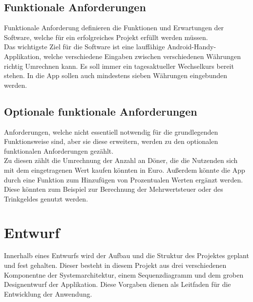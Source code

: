 \documentclass[conference]{IEEEtran}
\begin{document}
\subsection{Funktionale Anforderungen}
Funktionale Anforderung definieren die Funktionen und Erwartungen der Software, welche für ein erfolgreiches Projekt erfüllt werden müssen. \\
Das wichtigste Ziel für die Software ist eine lauffähige Android-Handy-Applikation, welche verschiedene Eingaben zwischen verschiedenen Währungen richtig Umrechnen kann. Es soll immer ein tagesaktueller Wechselkurs bereit stehen. In die App sollen auch mindestens sieben Währungen eingebunden werden.

\subsection{Optionale funktionale Anforderungen}
Anforderungen, welche nicht essentiell notwendig für die grundlegenden Funktionsweise sind, aber sie diese erweitern, werden zu den optionalen funktionalen Anforderungen gezählt. \\
Zu diesen zählt die Umrechnung der Anzahl an Döner, die die Nutzenden sich mit dem eingetragenen Wert kaufen könnten in Euro. Außerdem könnte die App durch eine Funktion zum Hinzufügen von Prozentualen Werten ergänzt werden. Diese könnten zum Beispiel zur Berechnung der Mehrwertsteuer oder des Trinkgeldes genutzt werden.

\section{Entwurf}
Innerhalb eines Entwurfs wird der Aufbau und die Struktur des Projektes geplant und fest gehalten. Dieser besteht in diesem Projekt aus drei verschiedenen Komponentne der Systemarchitektur, einem Sequenzdiagramm und dem groben Designentwurf der Applikation. Diese Vorgaben dienen als Leitfaden für die Entwicklung der Anwendung.
\end{document}
